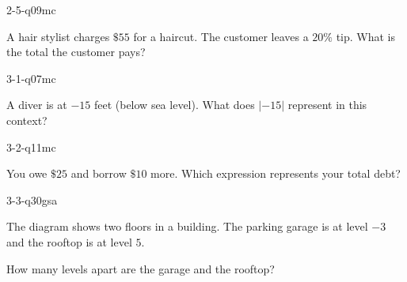 \begin{practiceQuestion}{2-5-q09}{mc}
\begin{questionText}
A hair stylist charges $\$55$ for a haircut. The customer leaves a $20\%$ tip. What is the total the customer pays?
\end{questionText}
\end{practiceQuestion}

\begin{practiceQuestion}{3-1-q07}{mc}
\begin{questionText}
A diver is at $-15$ feet (below sea level). What does $|-15|$ represent in this context?
\end{questionText}
\end{practiceQuestion}

\begin{practiceQuestion}{3-2-q11}{mc}
\begin{questionText}
You owe $\$25$ and borrow $\$10$ more. Which expression represents your total debt?
\end{questionText}
\end{practiceQuestion}

\begin{practiceQuestion}{3-3-q30}{gsa}
\begin{questionText}
The diagram shows two floors in a building. The parking garage is at level $-3$ and the rooftop is at level $5$.

\begin{center}
\end{center}

How many levels apart are the garage and the rooftop?
\end{questionText}
\end{practiceQuestion}

